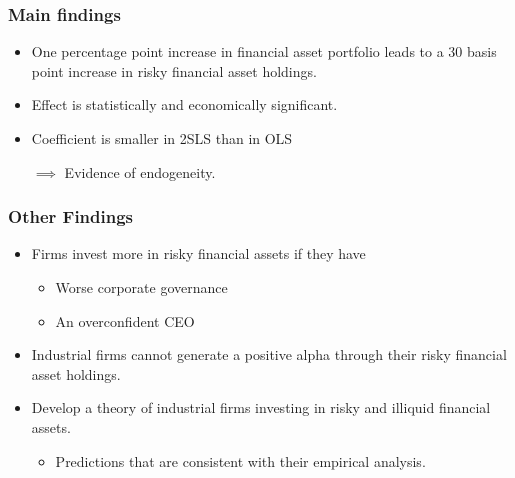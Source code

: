 \documentclass[handout]{beamer}
\begin{document}
\begin{frame}
\frametitle{Main findings}
\begin{itemize}[<+->]

\item One percentage point increase in financial asset portfolio leads to a 30 basis point increase in risky financial asset holdings.

\bigskip

\item Effect is statistically and economically significant.

\bigskip

\item Coefficient is smaller in 2SLS than in OLS 

\bigskip

$\implies$ Evidence of endogeneity.

\bigskip


\end{itemize}
\end{frame}


\begin{frame}[label=other]
\frametitle{Other Findings}
\begin{itemize}[<+->]
\item Firms invest more in risky financial assets if they have

\begin{itemize}[<+->]

\item Worse corporate governance

\item An overconfident CEO

\end{itemize}

\bigskip

\item Industrial firms cannot generate a positive alpha through their risky financial asset holdings. 

\bigskip

\item Develop a theory of industrial firms investing in risky and illiquid financial assets.

\begin{itemize}
\item Predictions that are consistent with their empirical analysis.
\end{itemize}

\end{itemize}

\end{frame}
\end{document}
